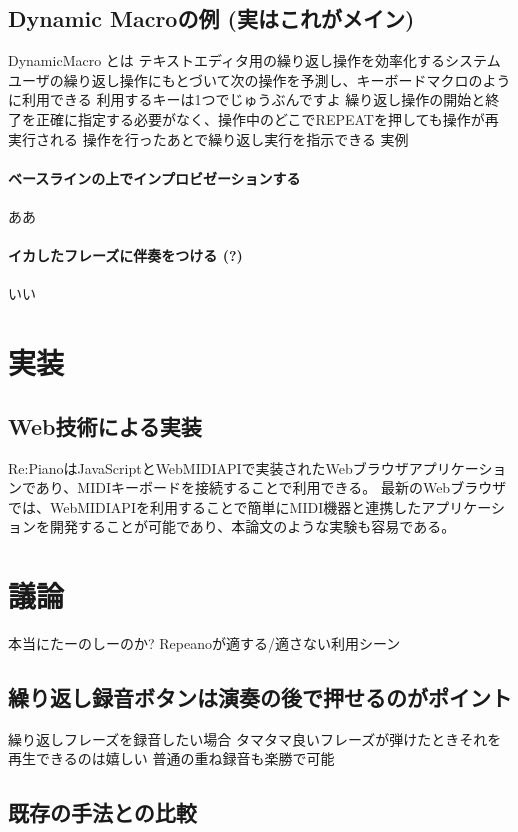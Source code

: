 \documentclass[submit,techreq]{ec2017}
\begin{document}
\subsection{Dynamic Macroの例 (実はこれがメイン)}
DynamicMacro \cite{Masui} とは
テキストエディタ用の繰り返し操作を効率化するシステム
ユーザの繰り返し操作にもとづいて次の操作を予測し、キーボードマクロのように利用できる
利用するキーは1つでじゅうぶんですよ
繰り返し操作の開始と終了を正確に指定する必要がなく、操作中のどこでREPEATを押しても操作が再実行される
操作を行ったあとで繰り返し実行を指示できる
実例
\paragraph*{ベースラインの上でインプロビゼーションする}
ああ
\paragraph*{イカしたフレーズに伴奏をつける (?)}
いい

\section{実装}

\subsection{Web技術による実装}
Re:PianoはJavaScriptとWebMIDIAPIで実装されたWebブラウザアプリケーションであり、MIDIキーボードを接続することで利用できる。
最新のWebブラウザでは、WebMIDIAPIを利用することで簡単にMIDI機器と連携したアプリケーションを開発することが可能であり、本論文のような実験も容易である。

\section{議論}

本当にたーのしーのか?
Repeanoが適する/適さない利用シーン
\subsection{繰り返し録音ボタンは演奏の後で押せるのがポイント}
繰り返しフレーズを録音したい場合
タマタマ良いフレーズが弾けたときそれを再生できるのは嬉しい
普通の重ね録音も楽勝で可能

\subsection{既存の手法との比較}
\end{document}

